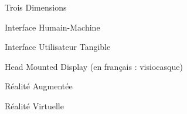 \item [3D] Trois Dimensions
\item [IHM] Interface Humain-Machine
\item [IUT] Interface Utilisateur Tangible
\item [HMD] Head Mounted Display (en français : visiocasque)
\item [RA] Réalité Augmentée
\item [RV] Réalité Virtuelle